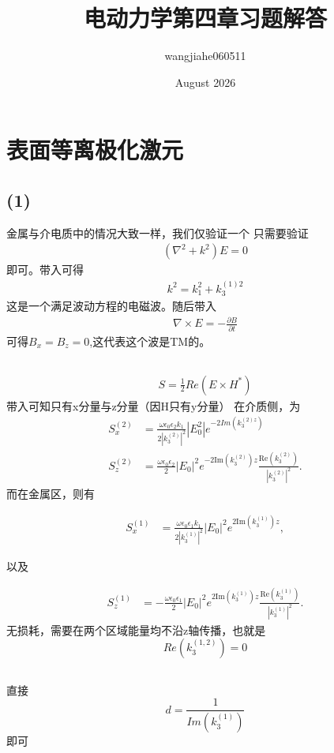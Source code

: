 \documentclass{article}
\title{电动力学第四章习题解答}
\author{wangjiahe060511}
\date{August 2026}
\newcommand{\e}{\epsilon}
\newcommand{\xd}{\nabla \times}%
\newcommand{\pdv}[2]{\frac{\partial #1}{\partial #2}}
\begin{document}
\maketitle
\section{表面等离极化激元}
\subsection{(1)}
金属与介电质中的情况大致一样，我们仅验证一个
只需要验证
\begin{align}
    (\nabla ^2+k^2)E=0
\end{align}
即可。带入可得
\begin{align}
    k^2=k_1^2+k_3^{(1)2}
\end{align}
这是一个满足波动方程的电磁波。随后带入
\begin{align}
    \xd E=-\pdv{B}{t}
\end{align}
可得$B_x=B_z=0$,这代表这个波是TM的。
\subsection{}
\begin{align}
    S=\frac12 Re(E\times H^*)
\end{align}
带入可知只有x分量与z分量（因H只有y分量）
在介质侧，为
\begin{align}
    S_x^{(2)}&=\frac{\omega \e_0 \e_2 k_1}{2|k_3^{(2)}|^2}|E_0^2|e^{-2Im(k_3^{(2)z})}\\
    S_z^{(2)}
&=
\frac{\omega\epsilon_0\epsilon_2}{2}
|E_0|^2
e^{-2\mathrm{Im}(k_3^{(2)})z}
\frac{\mathrm{Re}(k_3^{(2)})}
{|k_3^{(2)}|^2}.
\end{align}
而在金属区，则有

\begin{align}
S_x^{(1)}
&=
\frac{\omega\epsilon_0\epsilon_1 k_1}
{2|k_3^{(1)}|^2}
|E_0|^2
e^{2\mathrm{Im}(k_3^{(1)})z},
\end{align}

以及

\begin{align}
S_z^{(1)}
&=
-\frac{\omega\epsilon_0\epsilon_1}{2}
|E_0|^2
e^{2\mathrm{Im}(k_3^{(1)})z}
\frac{\mathrm{Re}(k_3^{(1)})}
{|k_3^{(1)}|^2}.
\end{align}
无损耗，需要在两个区域能量均不沿z轴传播，也就是$$Re(k_3^{(1,2)})=0$$
\subsection{}
直接$$d=\frac{1}{Im(k_3^{(1)})}$$即可
\end{document}
